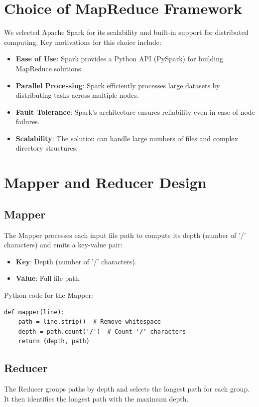 \documentclass[12pt]{article}
\begin{document}
\section{Choice of MapReduce Framework}
We selected Apache Spark for its scalability and built-in support for distributed computing. Key motivations for this choice include:
\begin{itemize}
    \item \textbf{Ease of Use}: Spark provides a Python API (PySpark) for building MapReduce solutions.
    \item \textbf{Parallel Processing}: Spark efficiently processes large datasets by distributing tasks across multiple nodes.
    \item \textbf{Fault Tolerance}: Spark's architecture ensures reliability even in case of node failures.
    \item \textbf{Scalability}: The solution can handle large numbers of files and complex directory structures.
\end{itemize}

\section{Mapper and Reducer Design}

\subsection{Mapper}
The Mapper processes each input file path to compute its depth (number of '/' characters) and emits a key-value pair:
\begin{itemize}
    \item \textbf{Key}: Depth (number of '/' characters).
    \item \textbf{Value}: Full file path.
\end{itemize}

\noindent Python code for the Mapper:
\begin{verbatim}
def mapper(line):
    path = line.strip()  # Remove whitespace
    depth = path.count('/')  # Count '/' characters
    return (depth, path)
\end{verbatim}

\subsection{Reducer}
The Reducer groups paths by depth and selects the longest path for each group. It then identifies the longest path with the maximum depth.
\end{document}
